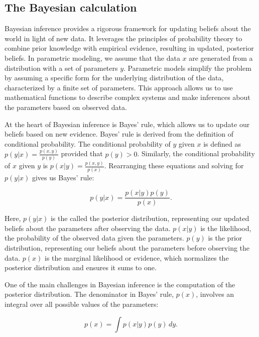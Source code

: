 \subsection{The Bayesian calculation}

Bayesian inference provides a rigorous framework for updating beliefs about the world in light of new data. It leverages the principles of probability theory to combine prior knowledge with empirical evidence, resulting in updated, posterior beliefs. In parametric modeling, we assume that the data $x$ are generated from a distribution with a set of parameters $y$. Parametric models simplify the problem by assuming a specific form for the underlying distribution of the data, characterized by a finite set of parameters. This approach allows us to use mathematical functions to describe complex systems and make inferences about the parameters based on observed data.

At the heart of Bayesian inference is Bayes' rule, which allows us to update our beliefs based on new evidence. Bayes' rule is derived from the definition of conditional probability. The conditional probability of $y$ given $x$ is defined as $p(y \lvert x) = \frac{p(x,y)}{p(y)}$ provided that $p(y) > 0$. Similarly, the conditional probability of $x$ given $y$ is $p(x \lvert y) = \frac{p(x,y)}{p(x)}$. Rearranging these equations and solving for $p(y\lvert x)$ gives us Bayes' rule:

\begin{equation*}
p(y \lvert x) = \frac{p(x \lvert y) p(y)}{p(x)}.
\end{equation*}

Here, $p(y \lvert x)$ is the called the posterior distribution, representing our updated beliefs about the parameters after observing the data. $p(x \lvert y)$ is the likelihood, the probability of the observed data given the parameters. $p(y)$ is the prior distribution, representing our beliefs about the parameters before observing the data. $p(x)$ is the marginal likelihood or evidence, which normalizes the posterior distribution and ensures it sums to one.

One of the main challenges in Bayesian inference is the computation of the posterior distribution. The denominator in Bayes' rule, $p(x)$, involves an integral over all possible values of the parameters:

\begin{equation*}
p(x) = \int p(x \lvert y) p(y) \, dy.
\end{equation*}


